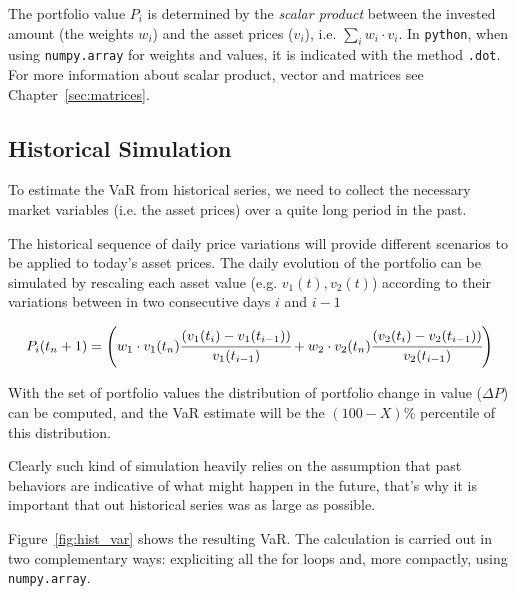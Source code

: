 The portfolio value $P_i$ is determined by the \emph{scalar product} between the invested amount (the weights $w_i$) and the asset prices ($v_i$), i.e. $\sum_{i} w_i \cdot v_i$. In \texttt{python}, when using \texttt{numpy.array} for weights and values, it is indicated with the method \texttt{.dot}. For more information about scalar product, vector and matrices see Chapter~\ref{sec:matrices}.

\subsection{Historical Simulation}
\label{historical-simulation}

To estimate the VaR from historical series, we need to collect the necessary market variables (i.e. the asset prices) over a quite long period in the past.

The historical sequence of daily price variations will provide different scenarios to be applied to today's asset prices. 
The daily evolution of the portfolio can be simulated by rescaling each asset value (e.g. \(v_1(t), v_2(t)\)) according to their variations between in two consecutive days \(i\) and \(i-1\)

\begin{equation}
P_i(t_n+1) = \left(w_1 \cdot v_1(t_n)\cfrac{(v_1(t_i)-v_1(t_{i-1}))}{v_1(t_{i-1})} + w_2\cdot  v_2(t_n)\cfrac{(v_2(t_i)-v_2(t_{i-1}))}{v_2(t_{i-1})}\right)
\end{equation}

With the set of portfolio values the distribution of portfolio change in value (\(\Delta P\)) can be computed, and the VaR estimate will be the $(100 - X)\%$ percentile of this distribution. 

Clearly such kind of simulation heavily relies on the assumption that past behaviors are indicative of what might happen in the future, that's why it is important that out historical series was as large as possible.



Figure~\ref{fig:hist_var} shows the resulting VaR. The calculation is carried out in two complementary ways: expliciting all the for loops and, more compactly, using \texttt{numpy.array}.

